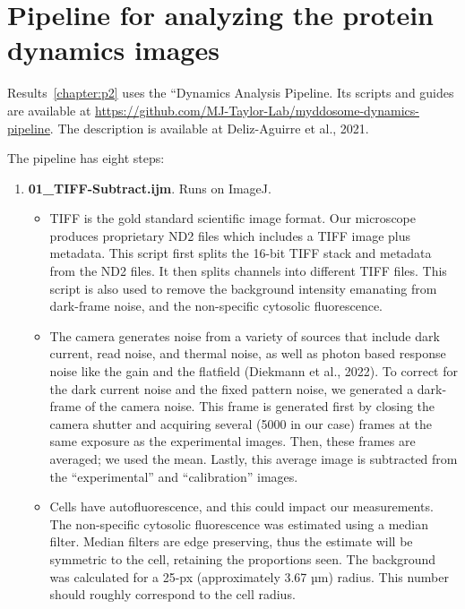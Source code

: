 \section{Pipeline for analyzing the protein dynamics images}
Results~\ref{chapter:p2} uses the “Dynamics Analysis Pipeline. Its scripts and guides are available at \url{https://github.com/MJ-Taylor-Lab/myddosome-dynamics-pipeline}. The description is available at Deliz-Aguirre et al., 2021.

The pipeline has eight steps:
\begin{enumerate}

\item \textbf{01\_TIFF-Subtract.ijm}. Runs on ImageJ.

\begin{itemize}

\item TIFF is the gold standard scientific image format. Our microscope produces proprietary ND2 files which includes a TIFF image plus metadata. This script first splits the 16-bit TIFF stack and metadata from the ND2 files. It then splits channels into different TIFF files. This script is also used to remove the background intensity emanating from dark-frame noise, and the non-specific cytosolic fluorescence. 

\item The camera generates noise from a variety of sources that include dark current, read noise, and thermal noise, as well as photon based response noise like the gain and the flatfield (Diekmann et al., 2022). To correct for the dark current noise and the fixed pattern noise, we generated a dark-frame of the camera noise. This frame is generated first by closing the camera shutter and acquiring several (5000 in our case) frames at the same exposure as the experimental images. Then, these frames are averaged; we used the mean. Lastly, this average image is subtracted from the “experimental” and “calibration” images.

\item Cells have autofluorescence, and this could impact our measurements. The non-specific cytosolic fluorescence was estimated using a median filter. Median filters are edge preserving, thus the estimate will be symmetric to the cell, retaining the proportions seen. The background was calculated for a 25-px (approximately 3.67 µm) radius. This number should roughly correspond to the cell radius.

\end{itemize}


\end{enumerate}
